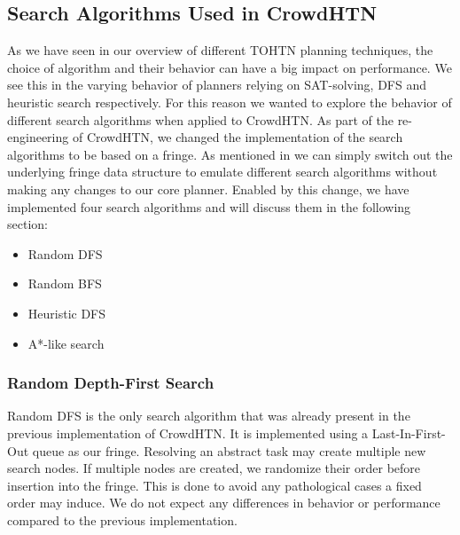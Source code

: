 \subsection{Search Algorithms Used in CrowdHTN}
\label{improv: search algorithms}
As we have seen in our overview of different TOHTN planning techniques, the choice of algorithm and their behavior can have a big impact on performance. We see this in the varying behavior of planners relying on SAT-solving, DFS and heuristic search respectively. For this reason we wanted to explore the behavior of different search algorithms when applied to CrowdHTN.
As part of the re-engineering of CrowdHTN, we changed the implementation of the search algorithms to be based on a fringe. As mentioned in \cite{holler2020htn} we can simply switch out the underlying fringe data structure to emulate different search algorithms without making any changes to our core planner. Enabled by this change, we have implemented four search algorithms and will discuss them in the following section:
\begin{itemize}
	\item Random DFS
	\item Random BFS
	\item Heuristic DFS
	\item A*-like search
\end{itemize}

\subsubsection{Random Depth-First Search}
Random DFS is the only search algorithm that was already present in the previous implementation of CrowdHTN. It is implemented using a Last-In-First-Out queue as our fringe. Resolving an abstract task may create multiple new search nodes. If multiple nodes are created, we randomize their order before insertion into the fringe. This is done to avoid any pathological cases a fixed order may induce. We do not expect any differences in behavior or performance compared to the previous implementation.

